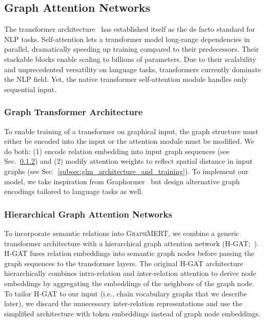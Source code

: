 \documentclass[10pt]{article}
\newcommand{\ours}{\textsc{GraphMERT}\xspace}
\begin{document}
\subsection{Graph Attention Networks}
\label{subsec:gan}
The transformer architecture~\cite{NIPS2017_attention_is_all_you_need} has established itself as the de facto standard 
for NLP tasks. Self-attention lets a transformer model long-range dependencies in parallel, dramatically speeding up training compared to their predecessors. Their stackable blocks enable scaling to billions of parameters. Due to their scalability and unprecedented versatility on language tasks, transformers currently dominate the NLP field. Yet, the native transformer self-attention module handles only sequential input.

\subsubsection{Graph Transformer Architecture}
\label{subsubsec:gta}

To enable training of a transformer on graphical input, the graph structure must either be encoded into the input or the attention module must be modified. We do both: (1) encode relation embedding into input graph sequences (see Sec.~\ref{subsubsec:h-gat}) and (2) modify attention weights to reflect spatial distance in input graphs (see Sec.~\ref{subsec:glm_architecture_and_training}). To implement our model, we take inspiration from Graphormer~\cite{NEURIPS2021_graphormer} but design alternative graph encodings tailored to language tasks as well.

\subsubsection{Hierarchical Graph Attention Networks}
\label{subsubsec:h-gat}
To incorporate semantic relations into \ours, we combine a generic transformer architecture with a hierarchical graph attention network (H-GAT;~\citealt{hgat2021, nathani-etal-2019-learning}). H-GAT fuses relation embeddings into semantic graph nodes before passing the graph sequences to the transformer layers. The original H-GAT architecture hierarchically combines intra-relation and inter-relation attention to derive node embeddings by aggregating the embeddings of the neighbors of the graph node. To tailor H-GAT to our input (i.e., chain vocabulary graphs that we describe later), we discard the unnecessary inter-relation representations and use the simplified architecture with token embeddings instead of graph node embeddings.
\end{document}
